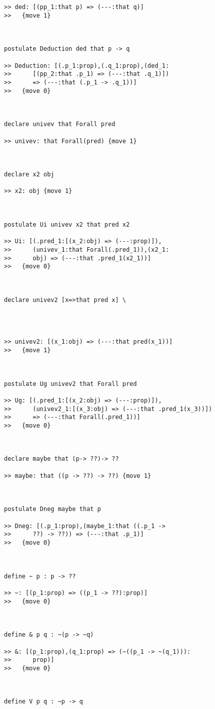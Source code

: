 \documentclass{article}
\begin{document}
\begin{verbatim}
>> ded: [(pp_1:that p) => (---:that q)]
>>   {move 1}



postulate Deduction ded that p -> q

>> Deduction: [(.p_1:prop),(.q_1:prop),(ded_1:
>>      [(pp_2:that .p_1) => (---:that .q_1)])
>>      => (---:that (.p_1 -> .q_1))]
>>   {move 0}



declare univev that Forall pred

>> univev: that Forall(pred) {move 1}



declare x2 obj

>> x2: obj {move 1}



postulate Ui univev x2 that pred x2

>> Ui: [(.pred_1:[(x_2:obj) => (---:prop)]),
>>      (univev_1:that Forall(.pred_1)),(x2_1:
>>      obj) => (---:that .pred_1(x2_1))]
>>   {move 0}



declare univev2 [x=>that pred x] \
   



>> univev2: [(x_1:obj) => (---:that pred(x_1))]
>>   {move 1}



postulate Ug univev2 that Forall pred

>> Ug: [(.pred_1:[(x_2:obj) => (---:prop)]),
>>      (univev2_1:[(x_3:obj) => (---:that .pred_1(x_3))])
>>      => (---:that Forall(.pred_1))]
>>   {move 0}



declare maybe that (p-> ??)-> ??

>> maybe: that ((p -> ??) -> ??) {move 1}



postulate Dneg maybe that p

>> Dneg: [(.p_1:prop),(maybe_1:that ((.p_1 ->
>>      ??) -> ??)) => (---:that .p_1)]
>>   {move 0}



define ~ p : p -> ??

>> ~: [(p_1:prop) => ((p_1 -> ??):prop)]
>>   {move 0}



define & p q : ~(p -> ~q)

>> &: [(p_1:prop),(q_1:prop) => (~((p_1 -> ~(q_1))):
>>      prop)]
>>   {move 0}



define V p q : ~p -> q


\end{verbatim}
\end{document}
